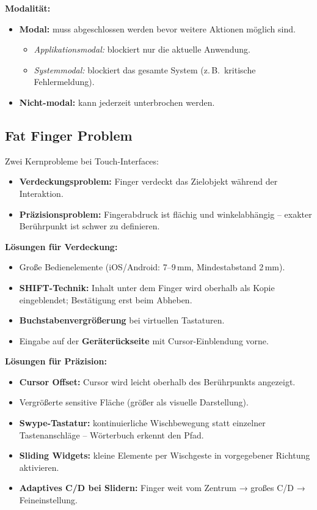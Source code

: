 \documentclass[12pt, a4paper]{article}
\begin{document}
\textbf{Modalität:}
\begin{itemize}
  \item \textbf{Modal:} muss abgeschlossen werden bevor weitere Aktionen möglich sind.
    \begin{itemize}
      \item \textit{Applikationsmodal:} blockiert nur die aktuelle Anwendung.
      \item \textit{Systemmodal:} blockiert das gesamte System (z.\,B.\ kritische Fehlermeldung).
    \end{itemize}
  \item \textbf{Nicht-modal:} kann jederzeit unterbrochen werden.
\end{itemize}

\subsection{Fat Finger Problem}

Zwei Kernprobleme bei Touch-Interfaces:
\begin{itemize}
  \item \textbf{Verdeckungsproblem:} Finger verdeckt das Zielobjekt während der Interaktion.
  \item \textbf{Präzisionsproblem:} Fingerabdruck ist flächig und winkelabhängig -- exakter Berührpunkt ist schwer zu definieren.
\end{itemize}

\textbf{Lösungen für Verdeckung:}
\begin{itemize}
  \item Große Bedienelemente (iOS/Android: 7–9\,mm, Mindestabstand 2\,mm).
  \item \textbf{SHIFT-Technik:} Inhalt unter dem Finger wird oberhalb als Kopie eingeblendet; Bestätigung erst beim Abheben.
  \item \textbf{Buchstabenvergrößerung} bei virtuellen Tastaturen.
  \item Eingabe auf der \textbf{Geräterückseite} mit Cursor-Einblendung vorne.
\end{itemize}

\textbf{Lösungen für Präzision:}
\begin{itemize}
  \item \textbf{Cursor Offset:} Cursor wird leicht oberhalb des Berührpunkts angezeigt.
  \item Vergrößerte sensitive Fläche (größer als visuelle Darstellung).
  \item \textbf{Swype-Tastatur:} kontinuierliche Wischbewegung statt einzelner Tastenanschläge -- Wörterbuch erkennt den Pfad.
  \item \textbf{Sliding Widgets:} kleine Elemente per Wischgeste in vorgegebener Richtung aktivieren.
  \item \textbf{Adaptives C/D bei Slidern:} Finger weit vom Zentrum → großes C/D → Feineinstellung.
\end{itemize}
\end{document}
